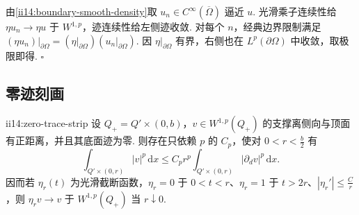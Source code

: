 \begin{FAProof}
由\autoref{ii14:boundary-smooth-density}取 \(\displaystyle u_n\in C^\infty(\overline\Omega)\) 逼近 \(\displaystyle u\). 光滑乘子连续性给 \(\displaystyle\eta u_n\to\eta u\) 于 \(\displaystyle W^{1,p}\)，迹连续性给左侧迹收敛. 对每个 \(\displaystyle n\)，经典边界限制满足 \(\displaystyle(\eta u_n)|_{\partial\Omega}=(\eta|_{\partial\Omega})(u_n|_{\partial\Omega})\). 因 \(\displaystyle\eta|_{\partial\Omega}\) 有界，右侧也在 \(\displaystyle L^p(\partial\Omega)\) 中收敛，取极限即得.
\hfill\(\square\)
\end{FAProof}

\subsection{零迹刻画}

\begin{FALemma}[B][平坦零迹条带估计]{ii14:zero-trace-strip}
设 \(\displaystyle Q_+=Q'\times(0,b)\)，\(\displaystyle v\in W^{1,p}(Q_+)\) 的支撑离侧向与顶面有正距离，并且其底面迹为零. 则存在只依赖 \(\displaystyle p\) 的 \(\displaystyle C_p\)，使对 \(\displaystyle0<r<\frac{b}{2}\) 有
\[
\int_{Q'\times(0,r)}|v|^p\,\mathrm{d}x
\leqslant
C_pr^p
\int_{Q'\times(0,r)}|\partial_dv|^p\,\mathrm{d}x.
\]
因而若 \(\displaystyle\eta_r(t)\) 为光滑截断函数，\(\displaystyle\eta_r=0\) 于 \(\displaystyle0<t<r\)、\(\displaystyle\eta_r=1\) 于 \(\displaystyle t>2r\)、\(\displaystyle|\eta_r'|\leqslant \frac{C}{r}\)，则 \(\displaystyle\eta_rv\to v\) 于 \(\displaystyle W^{1,p}(Q_+)\) 当 \(\displaystyle r\downarrow0\).
\end{FALemma}

